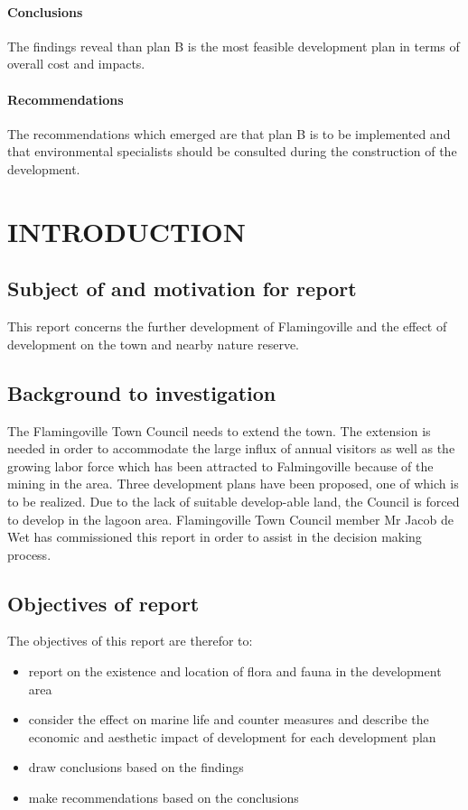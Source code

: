 \documentclass{article}
\begin{document}
\paragraph{Conclusions}
The findings reveal than plan B is the most feasible development plan in terms of overall cost and impacts.

\paragraph{Recommendations}
The recommendations which emerged are that plan B is to be implemented and that environmental specialists should be consulted during the construction of the development.

\newpage
\tableofcontents

\setcounter{page}{0}

\newpage
\section{INTRODUCTION}
\subsection{Subject of and motivation for report}
This report concerns the further development of Flamingoville and the effect of development on the town and nearby nature reserve.

\subsection{Background to investigation}
The Flamingoville Town Council needs to extend the town. The extension is needed in order to accommodate the large influx of annual visitors as well as the growing labor force which has been attracted to Falmingoville because of the mining in the area. Three development plans have been proposed, one of which is to be realized. Due to the lack of suitable develop-able land, the Council is forced to develop in the lagoon area. Flamingoville Town Council member Mr Jacob de Wet has commissioned this report in order to assist in the decision making process.

\subsection{Objectives of report}
The objectives of this report are therefor to:
\begin{itemize}
	\item report on the existence and location of flora and fauna in the development area
	\item consider the effect on marine life and counter measures and describe the economic and aesthetic impact of development for each development plan
	\item draw conclusions based on the findings
	\item make recommendations based on the conclusions
\end{itemize}
\end{document}

